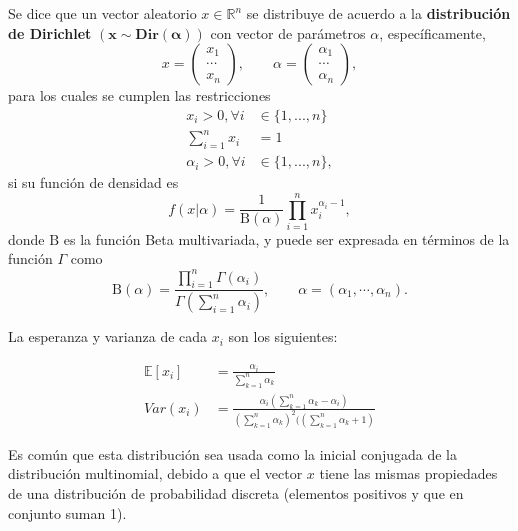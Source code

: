 \begin{defin}
    Se dice que un vector aleatorio $x \in \mathbb{R}^n$ se distribuye de acuerdo a la \textbf{distribuci\'on de Dirichlet}  $\mathbf{(x \sim Dir(\alpha))}$ con vector de par\'ametros $\alpha$, espec\'ificamente,
    \begin{equation*}
        x = 
        \left(\begin{array}{c}
            x_1  \\
            \cdots \\
            x_n
        \end{array}\right),
        \qquad
        \alpha = 
        \left(\begin{array}{c}
            \alpha_1  \\
            \cdots \\
            \alpha_n
        \end{array}\right),
    \end{equation*}
    para los cuales se cumplen las restricciones
    \begin{equation*}
    \begin{aligned}
        x_i > 0, \forall i &\in \{1,...,n\} \\
        \sum_{i=1}^n x_i &= 1 \\
        \alpha_i > 0, \forall i &\in \{1,...,n\},
    \end{aligned}
    \end{equation*}
    si su funci\'on de densidad  es
    \begin{equation*}
        f(x|\alpha) = 
        \frac {1}{\mathrm {B} (\alpha)}
        \prod _{i=1}^{n}x_{i}^{\alpha _{i}-1},
    \end{equation*}
    donde $\mathrm{B}$ es la funci\'on Beta multivariada, y puede ser expresada en t\'erminos de la funci\'on $\Gamma$ como 
    \begin{equation*}
       \mathrm{B}(\alpha)=
       \frac {\prod _{i=1}^{n}\Gamma (\alpha _{i})}
       {\Gamma \left(\sum _{i=1}^{n}\alpha _{i}\right)},
       \qquad 
       \alpha =(\alpha _1,\cdots ,\alpha _n). 
    \end{equation*}
    
    La esperanza y varianza de cada $x_i$ son los siguientes:
    
    \begin{equation*}
    \begin{aligned}
        \mathbb{E}[x_i] &= \frac{\alpha_i}{\sum_{k=1}^n \alpha_k} \\
        Var(x_i) &= \frac
        {\alpha_i \left( \sum_{k=1}^n \alpha_k - \alpha_i \right)}
        {\left( \sum_{k=1}^n \alpha_k \right)^2 (\left( \sum_{k=1}^n \alpha_k + 1 \right)}
    \end{aligned}
    \end{equation*}
    
\end{defin}
Es com\'un que esta distribuci\'on sea usada como la inicial conjugada de la distribuci\'on multinomial, debido a que el vector $x$ tiene las mismas propiedades de una distribuci\'on de probabilidad discreta (elementos positivos y que en conjunto suman 1).

